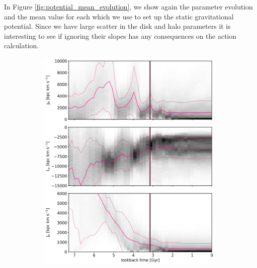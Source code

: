 In Figure \ref{fig:potential_mean_evolution}, we show again the parameter evolution and the mean value for each which we use to set up the static gravitational potential. Since we have large scatter in the disk and halo parameters it is interesting to see if ignoring their slopes has any consequences on the action calculation. 
\begin{figure}[htbp]
\captionsetup{format=plain}
    \begin{subfigure}[c]{0.48\textwidth}
    \centering
    	\includegraphics[width=\textwidth]{plots/Dynamics/prog2/action_time_evolution_wodisk_hist_mean.png}
    \end{subfigure}
    ~
    \begin{subfigure}[c]{0.48\textwidth}
    \centering

\end{subfigure}
\end{figure}
